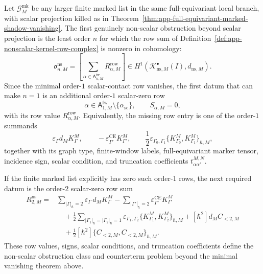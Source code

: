 \begin{prop}
\label{prop:app-first-missing-nonscalar-row}
  Let \(\mathcal G^{\mathrm{mk}}_M\) be any larger finite marked list in
  the same full-equivariant local branch, with scalar projection killed as
  in Theorem~\ref{thm:app-full-equivariant-marked-shadow-vanishing}.  The
  first genuinely non-scalar obstruction beyond scalar
  projection is the least order \(n\) for which the row sum of
  Definition~\ref{def:app-nonscalar-kernel-row-complex} is nonzero in
  cohomology:
  \[
    \mathfrak o^{\mathrm{ns}}_{n,M}
      =
    \left[
      \sum_{\alpha\in\mathsf A^{\mathrm{fw}}_{n,M}}
      R^{\mathrm{row}}_{\alpha,M}
    \right]
    \in H^1\!\left(
      \mathcal K^\bullet_{\mathrm{ns},M}(I),d_{\mathrm{ns},M}
    \right).
  \]
  Since the minimal order-\(1\) scalar-contact row vanishes, the first
  datum that can make \(n=1\) is an additional order-\(1\) scalar-zero
  row
  \[
    \alpha\in
    \mathsf A^{\mathrm{fw}}_{1,M}\setminus\{\alpha_{\mathrm{sc}}\},
    \qquad
    S_{\alpha,M}=0,
  \]
  with its row value \(R^{\mathrm{row}}_{\alpha,M}\).  Equivalently,
  the missing row entry is one of the order-\(1\) summands
  \[
    \varepsilon_\Gamma d_M K^M_\Gamma,\qquad
    -\varepsilon^{\mathrm{CE}}_{\Gamma'}K^M_{\Gamma'},\qquad
    \frac12\varepsilon_{\Gamma_0,\Gamma_1}
      \{K^M_{\Gamma_0},K^M_{\Gamma_1}\}_{\hbar,M},
  \]
  together with its graph type, finite-window labels, full-equivariant
  marker tensor, incidence sign, scalar condition, and truncation coefficients
  \(t^{M,N}_{\alpha\alpha'}\).

  If the finite marked list explicitly has zero such order-\(1\) rows, the
  next required datum is the order-\(2\) scalar-zero row sum
  \[
  \begin{aligned}
    R^{\mathrm{ns}}_{2,M}
      ={}&
      \sum_{|\Gamma|_\hbar=2}
        \varepsilon_\Gamma\,d_M K^M_\Gamma
      -\sum_{|\Gamma'|_\hbar=2}
        \varepsilon^{\mathrm{CE}}_{\Gamma'}K^M_{\Gamma'}\\
      &\quad
      +\frac12
      \sum_{|\Gamma_1|_\hbar=|\Gamma_2|_\hbar=1}
        \varepsilon_{\Gamma_1,\Gamma_2}
        \{K^M_{\Gamma_1},K^M_{\Gamma_2}\}_{\hbar,M}
      +[\hbar^2]d_M C_{<2,M}\\
      &\quad
      +\frac12[\hbar^2]
        \{C_{<2,M},C_{<2,M}\}_{\hbar,M}.
  \end{aligned}
  \]
  These row values, signs, scalar conditions, and truncation coefficients
  define the non-scalar obstruction class and counterterm problem beyond
  the minimal vanishing theorem above.
\end{prop}


